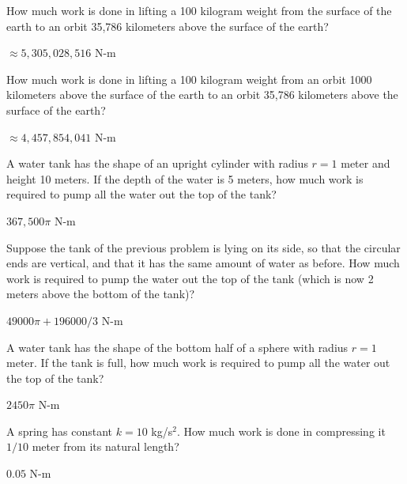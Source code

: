 \begin{enumialphparenastyle}

\begin{ex}
 How much work is done in lifting a 100 kilogram weight from
the surface of the earth to an orbit 35,786 kilometers above the
surface of the earth?
\begin{sol}
 $\approx 5,305,028,516$ N-m
\end{sol}
\end{ex}

\begin{ex}
 How much work is done in lifting a 100 kilogram weight from
an orbit 1000 kilometers above the surface of the earth to an orbit
35,786 kilometers above the surface of the earth?
\begin{sol}
 $\approx 4,457,854,041$ N-m
\end{sol}
\end{ex}

\begin{ex}
 A water tank has the shape of an upright cylinder with radius $r=1$
meter and height 10 meters. If the depth of the water is 5 meters, how
much work is required to pump all the water out the top of the tank?
\begin{sol}
 $367,500 \pi$ N-m
\end{sol}
\end{ex}

\begin{ex}
 Suppose the tank of the previous problem is lying on its
side, so that the circular ends are vertical, and that it has the same
amount of water as before. How much work is required to pump the water
out the top of the tank (which is now 2 meters above the bottom of the
tank)?
\begin{sol}
 $49000\pi + 196000/3$ N-m
\end{sol}
\end{ex}

\begin{ex}
 A water tank has the shape of the bottom half of a sphere
with radius $r=1$ meter. If the tank is full,
how much work is required to pump all the water out
the top of the tank?
\begin{sol}
 $2450\pi$ N-m
\end{sol}
\end{ex}

\begin{ex}
 A spring has constant $k=10$ kg/s$^2$. How much work is done
in compressing it $1/10$ meter from its natural length?
\begin{sol}
 $0.05$ N-m
\end{sol}
\end{ex}


\end{enumialphparenastyle}

